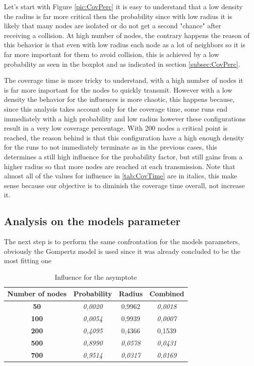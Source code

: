 Let's start with Figure \ref{pic:CovPerc} it is easy to understand that a low density the radius is far more critical then the probability since with low radius it is likely that many nodes are isolated or do not get a second "chance" after receiving a collision. At high number of nodes, the contrary happens the reason of this behavior is that even with low radius each node as a lot of neighbors so it is far more important for them to avoid collision, this is achieved by a low probability as seen in the boxplot and as indicated in section \ref{subsec:CovPerc}.

The coverage time is more tricky to understand, with a high number of nodes it is far more important for the nodes to quickly transmit. However with a low density the behavior for the influences is more chaotic, this happens because, since this analysis takes account only for the coverage time, some runs end immediately with a high probability and low radius however these configurations result in a very low coverage percentage. With 200 nodes a critical point is reached, the reason behind is that this configuration have a high enough density for the runs to not immediately terminate as in the previous cases, this determines a still high influence for the probability factor, but still gains from a higher radius so that more nodes are reached at each transmission. Note that almost all of the values for influence in \ref{tab:CovTime} are in italics, this make sense because our objective is to diminish the coverage time overall, not increase it.

\subsection{Analysis on the models parameter}
The next step is to perform the same confrontation for the models parameters, obviously the Gompertz model is used since it was already concluded to be the most fitting one

\begin{table}[H]
\centering
\begin{tabular}{|c|c|c|c|}
\hline
\textbf{Number of   nodes} & \textbf{Probability} & \textbf{Radius} & \textbf{Combined} \\ \hline
\textbf{50} & \textit{0,0020} & 0,9962 & \textit{0,0018} \\ \hline
\textbf{100} & \textit{0,0054} & 0,9939 & \textit{0,0007} \\ \hline
\textbf{200} & \textit{0,4095} & 0,4366 & 0,1539 \\ \hline
\textbf{500} & \textit{0,8990} & \textit{0,0578} & \textit{0,0431} \\ \hline
\textbf{700} & \textit{0,9514} & \textit{0,0317} & \textit{0,0169} \\ \hline
\end{tabular}
\caption{Influence for the asymptote}
\end{table}

